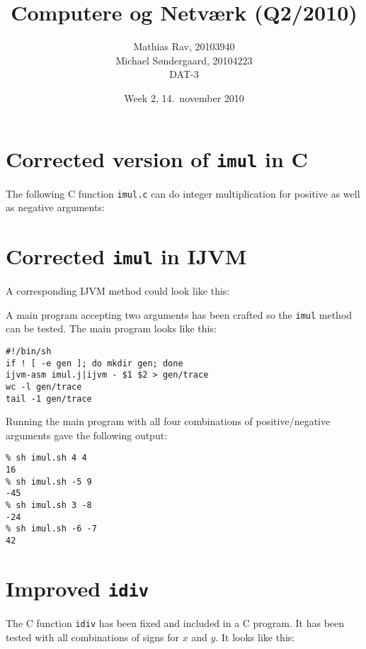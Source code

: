 \documentclass[12pt,a4paper]{article}
\title{Computere og Netværk (Q2/2010)}
\author{Mathias Rav, 20103940 \\
		Michael Søndergaard, 20104223 \\
		DAT-3}
\date{Week 2, 14.\ november 2010}
\newcommand{\imul}{\texttt{imul}}
\begin{document}
\maketitle

\section{Corrected version of \imul{} in C}

The following C function \texttt{imul.c} can do integer multiplication for
positive as well as negative arguments:

\lstset{language=C}


\section{Corrected \imul{} in IJVM}

A corresponding IJVM method could look like this:

\lstset{language=JVMIS}


A main program accepting two arguments has been crafted so the \texttt{imul}
method can be tested. The main program looks like this:

\lstset{language=sh}
\begin{lstlisting}
#!/bin/sh
if ! [ -e gen ]; do mkdir gen; done
ijvm-asm imul.j|ijvm - $1 $2 > gen/trace
wc -l gen/trace
tail -1 gen/trace
\end{lstlisting}

\clearpage

Running the main program with all four combinations of positive/negative arguments gave the following output:

\lstset{language=sh,numbers=none}
\begin{lstlisting}
% sh imul.sh 4 4
16
% sh imul.sh -5 9
-45
% sh imul.sh 3 -8
-24
% sh imul.sh -6 -7
42
\end{lstlisting}

\section{Improved \texttt{idiv}}

The C function \texttt{idiv} has been fixed and included in a C program. It has
been tested with all combinations of signs for $x$ and $y$. It looks like this:

\lstset{language=C,numbers=left}

\end{document}

